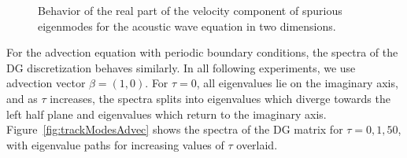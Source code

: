 \documentclass[10pt]{article}
\begin{document}
\begin{figure}
\centering
{}
\hspace{.5em}
\hspace{.5em}
\caption{Behavior of the real part of the velocity component of spurious eigenmodes for the acoustic wave equation in two dimensions.  }
\label{fig:trackModesWaveU}
\end{figure}


For the advection equation with periodic boundary conditions, the spectra of the DG discretization behaves similarly.  In all following experiments, we use advection vector $\beta = (1,0)$.  For $\tau=0$, all eigenvalues lie on the imaginary axis, and as $\tau$ increases, the spectra splits into eigenvalues which diverge towards the left half plane and eigenvalues which return to the imaginary axis.  Figure~\ref{fig:trackModesAdvec} shows the spectra of the DG matrix for $\tau = 0,1,50$, with eigenvalue paths for increasing values of $\tau$ overlaid.  
\end{document}
